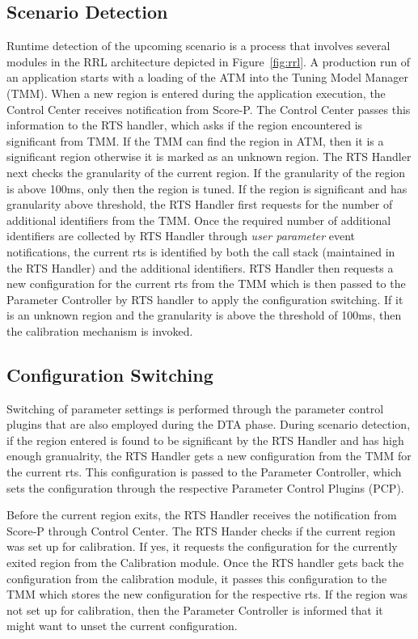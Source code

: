 \subsection{Scenario Detection}\label{scenario-detection}
 Runtime detection of the upcoming scenario is a process that involves several modules in the RRL architecture depicted in Figure~\ref{fig:rrl}. A production run of an application starts with a loading of the ATM into the Tuning Model Manager (TMM). When a new region is entered during the application execution, the Control Center receives notification from Score-P. The Control Center passes this information to the RTS handler, which asks if the region encountered is significant from TMM. If the TMM can find the region in ATM, then it is a significant region otherwise it is marked as an unknown region. The RTS Handler next checks the granularity of the current region. If the granularity of the region is above 100ms, only then the region is tuned. If the region is significant and has granularity above threshold, the RTS Handler first requests for the number of additional identifiers from the TMM. Once the required number of additional identifiers are collected by RTS Handler through \textit{user parameter} event notifications, the current rts is identified by both the call stack (maintained in the RTS Handler) and the additional identifiers.
RTS Handler then requests a new configuration for the current rts from the TMM which is then passed to the Parameter Controller by RTS handler to apply the configuration switching.  
If it is an unknown region and the granularity is above the threshold of 100ms, then the calibration mechanism is invoked.

\subsection{Configuration Switching}\label{config-switching}
 Switching of parameter settings is performed through the parameter control plugins that are also employed during the DTA phase.
During scenario detection, if the region entered is found to be significant by the RTS Handler and has high enough granualrity, the RTS Handler gets a new configuration from the TMM for the current rts. 
This configuration is passed to the Parameter Controller, which sets the configuration through the respective Parameter Control Plugins (PCP).

Before the current region exits, the RTS Handler receives the notification  from Score-P through Control Center. 
The RTS Hander checks if the current region was set up for calibration. If yes, it requests the configuration for the currently exited region from the
Calibration module. Once the RTS handler gets back the configuration from the calibration module, it passes this configuration to the TMM which stores the new configuration for the respective rts. If the region was not set up for calibration, then the Parameter Controller is informed that it might want to unset the current configuration. 

